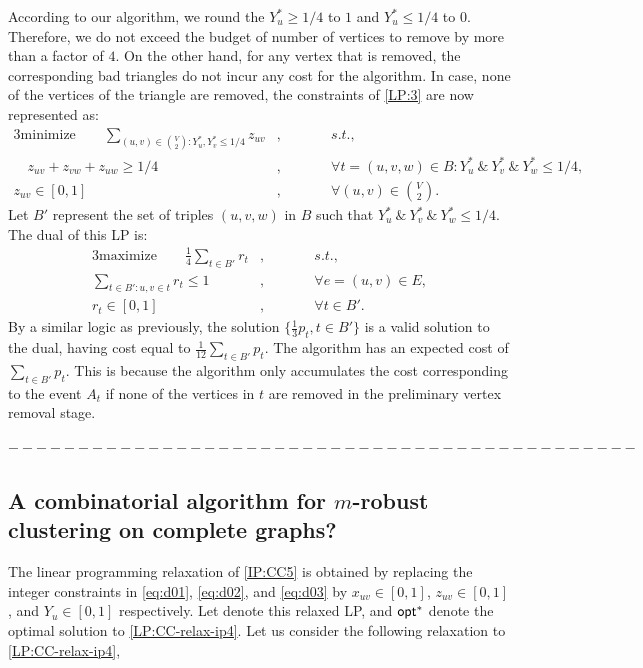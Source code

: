 According to our algorithm, we round the $Y_u^* \ge 1/4$ to $1$ and $Y_u^* \le 1/4$ to $0$. Therefore, we do not exceed the budget of number of vertices to remove by more than a factor of $4$. On the other hand, for any vertex that is removed, the corresponding bad triangles do not incur any cost for the algorithm. In case, none of the vertices of the triangle are removed, the constraints of \ref{LP:3} are now represented as:
\begin{alignat}{3} \label{LP:CC-relax-reduced:2}
		\text{minimize} \qquad \sum_{(u,v) \in \binom{V}{2} : Y_u^*, Y_v^* \le 1/4} z_{uv}&, \qquad &&s.t., \nonumber\\
		\quad z_{uv} + z_{vw} + z_{uw} \ge 1/4 &, \qquad &&\forall t = (u,v,w) \in B : Y_u^* \ \&\ Y_v^* \ \&\ Y_w^* \le 1/4, \nonumber\\
		z_{uv} \in [ 0,1 ]&, \qquad &&\forall (u,v) \in \binom{V}{2}. \tag{LP4}
\end{alignat}
Let $B'$ represent the set of triples $(u,v,w)$ in $B$ such that $Y_u^* \ \&\ Y_v^* \ \&\ Y_w^* \le 1/4$.
The dual of this LP is:
\begin{alignat}{3} \label{LP:CC-relax-reduced-dual:2}
		\text{maximize}\qquad \frac{1}{4} \sum_{t \in B'} r_t &, && \qquad s.t., \nonumber\\
		\sum_{t \in B' : u,v \in t} r_t \le 1 &, &&\qquad \forall e = (u,v) \in E, \nonumber\\
		r_{t} \in [ 0,1 ] &, &&\qquad \forall t \in B'.\tag{LP5}
\end{alignat}
By a similar logic as previously, the solution $\{ \frac{1}{3} p_t, t \in B'\}$ is a valid solution to the dual, having cost equal to $\frac{1}{12} \sum_{t \in B'} p_t$. The algorithm has an expected cost of $\sum_{t \in B'} p_t$. This is because the algorithm only accumulates the cost corresponding to the event $A_t$ if none of the vertices in $t$ are removed in the preliminary vertex removal stage.

$---------------------------------------------$

\subsection{A combinatorial algorithm for $m$-robust clustering on complete graphs?}

The linear programming relaxation of \ref{IP:CC5} is obtained by replacing the integer constraints in \eqref{eq:d01}, \eqref{eq:d02}, and \eqref{eq:d03} by $x_{uv} \in [0,1]$, $z_{uv} \in [0,1]$, and $Y_u \in[0,1]$ respectively. Let  denote this relaxed LP, and $\mathsf{opt}^*$ denote the optimal solution to \ref{LP:CC-relax-ip4}. Let us consider the following relaxation to \ref{LP:CC-relax-ip4},

